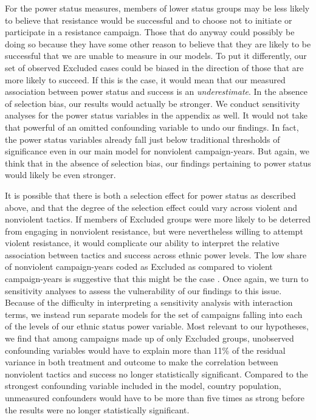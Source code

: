 \documentclass[
  letterpaper,
  DIV=11,
  numbers=noendperiod]{scrartcl}
\begin{document}
For the power status measures, members of lower status groups may be
less likely to believe that resistance would be successful and to choose
not to initiate or participate in a resistance campaign. Those that do
anyway could possibly be doing so because they have some other reason to
believe that they are likely to be successful that we are unable to
measure in our models. To put it differently, our set of observed
Excluded cases could be biased in the direction of those that are more
likely to succeed. If this is the case, it would mean that our measured
association between power status and success is an \emph{underestimate}.
In the absence of selection bias, our results would actually be
stronger. We conduct sensitivity analyses for the power status variables
in the appendix as well. It would not take that powerful of an omitted
confounding variable to undo our findings. In fact, the power status
variables already fall just below traditional thresholds of significance
even in our main model for nonviolent campaign-years. But again, we
think that in the absence of selection bias, our findings pertaining to
power status would likely be even stronger.

It is possible that there is both a selection effect for power status as
described above, and that the degree of the selection effect could vary
across violent and nonviolent tactics. If members of Excluded groups
were more likely to be deterred from engaging in nonviolent resistance,
but were nevertheless willing to attempt violent resistance, it would
complicate our ability to interpret the relative association between
tactics and success across ethnic power levels. The low share of
nonviolent campaign-years coded as Excluded as compared to violent
campaign-years is suggestive that this might be the case \autocite[see
also][]{Thurber2018}. Once again, we turn to sensitivity analyses to
assess the vulnerability of our findings to this issue. Because of the
difficulty in interpreting a sensitivity analysis with interaction
terms, we instead run separate models for the set of campaigns falling
into each of the levels of our ethnic status power variable. Most
relevant to our hypotheses, we find that among campaigns made up of only
Excluded groups, unobserved confounding variables would have to explain
more than 11\% of the residual variance in both treatment and outcome to
make the correlation between nonviolent tactics and success no longer
statistically significant. Compared to the strongest confounding
variable included in the model, country population, unmeasured
confounders would have to be more than five times as strong before the
results were no longer statistically significant.
\end{document}
